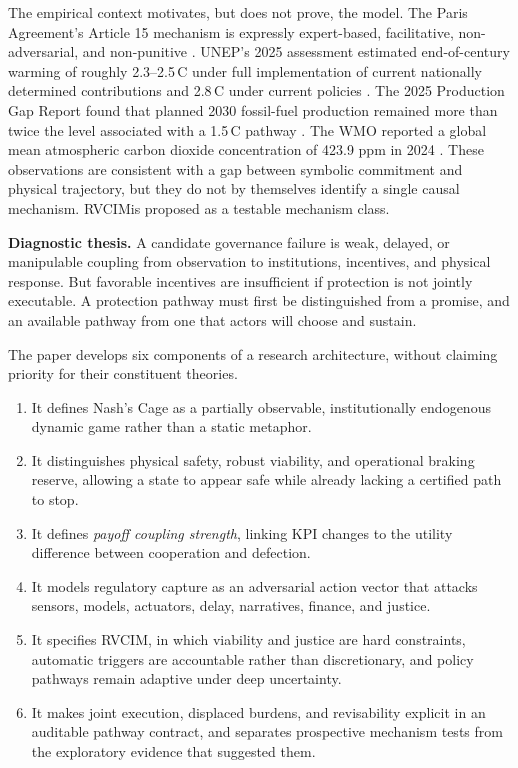 \documentclass[11pt,a4paper]{article}
\numberwithin{equation}{section}
\theoremstyle{definition}
\theoremstyle{plain}
\theoremstyle{remark}
\newcommand{\RVCIM}{\textsc{RVCIM}}
\begin{document}
The empirical context motivates, but does not prove, the model. The Paris Agreement's Article 15 mechanism is expressly expert-based, facilitative, non-adversarial, and non-punitive \citep{unfccc2015,unfcccpaicc}. UNEP's 2025 assessment estimated end-of-century warming of roughly 2.3--2.5\,\textdegree C under full implementation of current nationally determined contributions and 2.8\,\textdegree C under current policies \citep{unep2025}. The 2025 Production Gap Report found that planned 2030 fossil-fuel production remained more than twice the level associated with a 1.5\,\textdegree C pathway \citep{productiongap2025}. The WMO reported a global mean atmospheric carbon dioxide concentration of 423.9 ppm in 2024 \citep{wmo2025}. These observations are consistent with a gap between symbolic commitment and physical trajectory, but they do not by themselves identify a single causal mechanism. \RVCIM is proposed as a testable mechanism class.

\begin{corebox}
\textbf{Diagnostic thesis.} A candidate governance failure is weak, delayed, or manipulable coupling from observation to institutions, incentives, and physical response. But favorable incentives are insufficient if protection is not jointly executable. A protection pathway must first be distinguished from a promise, and an available pathway from one that actors will choose and sustain.
\end{corebox}

The paper develops six components of a research architecture, without claiming priority for their constituent theories.

\begin{enumerate}
  \item It defines Nash's Cage as a partially observable, institutionally endogenous dynamic game rather than a static metaphor.
  \item It distinguishes physical safety, robust viability, and operational braking reserve, allowing a state to appear safe while already lacking a certified path to stop.
  \item It defines \emph{payoff coupling strength}, linking KPI changes to the utility difference between cooperation and defection.
  \item It models regulatory capture as an adversarial action vector that attacks sensors, models, actuators, delay, narratives, finance, and justice.
  \item It specifies \RVCIM, in which viability and justice are hard constraints, automatic triggers are accountable rather than discretionary, and policy pathways remain adaptive under deep uncertainty.
  \item It makes joint execution, displaced burdens, and revisability explicit in an auditable pathway contract, and separates prospective mechanism tests from the exploratory evidence that suggested them.
\end{enumerate}
\end{document}
